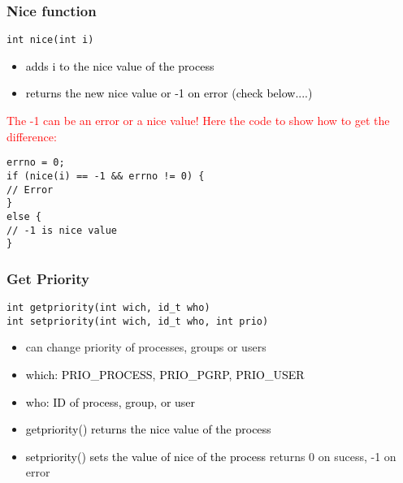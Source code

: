 \documentclass[main.tex,fontsize=8pt,paper=a4,paper=portrait,DIV=calc,]{scrartcl}
\begin{document}
\subsubsection{Nice function}
\begin{lstlisting}
int nice(int i)
\end{lstlisting}
\begin{itemize}
\item \textcolor{black}{adds i to the nice value of the process}
\item \textcolor{black}{returns the new nice value or -1 on error (check below....)}
\end{itemize} 
\textcolor{red}{The -1 can be an error or a nice value! Here the code to show how to get the difference:}
\begin{lstlisting}
errno = 0;
if (nice(i) == -1 && errno != 0) {
// Error
}
else {
// -1 is nice value
}
\end{lstlisting}

\subsubsection{Get Priority}
\begin{lstlisting}
int getpriority(int wich, id_t who)
int setpriority(int wich, id_t who, int prio)
\end{lstlisting}
\begin{itemize}
  \item can change priority of processes, groups or users
\item \textcolor{black}{which: PRIO\_PROCESS, PRIO\_PGRP, PRIO\_USER}
\item \textcolor{black}{who: ID of process, group, or user}
\item \textcolor{black}{getpriority() returns the nice value of the process}
\item \textcolor{black}{setpriority() sets the value of nice of the process}\newline
  returns 0 on sucess, -1 on error
\end{itemize} 
\end{document}
